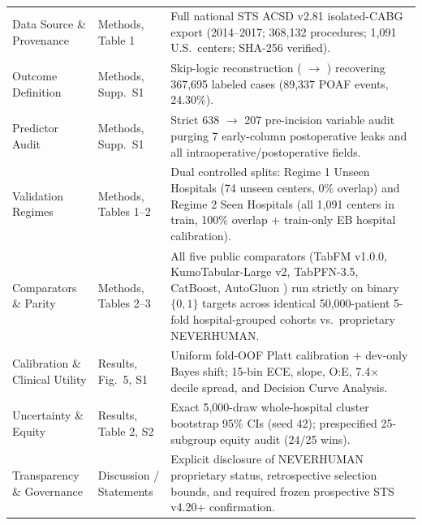 \begin{table}[H]
\centering
\caption{}
\label{tab:supp_tripod}
\tablefont
\setlength{\tabcolsep}{4pt}
\begin{tabularx}{\textwidth}{@{}L{3.2cm} L{2.0cm} Y@{}}
\toprule
{} &  &  \\
\midrule
Data Source \& Provenance & Methods, Table 1 & Full national STS ACSD v2.81 isolated-CABG export (2014--2017; 368,132 procedures; 1,091 U.S.\ centers; SHA-256 verified). \\
Outcome Definition & Methods, Supp.\ S1 & Skip-logic reconstruction ( $\to$ ) recovering 367,695 labeled cases (89,337 POAF events, 24.30\%). \\
Predictor Audit & Methods, Supp.\ S1 & Strict 638 $\to$ 207 pre-incision variable audit purging 7 early-column postoperative leaks and all intraoperative/postoperative fields. \\
Validation Regimes & Methods, Tables 1--2 & Dual controlled splits: Regime 1 Unseen Hospitals (74 unseen centers, 0\% overlap) and Regime 2 Seen Hospitals (all 1,091 centers in train, 100\% overlap + train-only EB hospital calibration). \\
Comparators \& Parity & Methods, Tables 2--3 & All five public comparators (TabFM v1.0.0, KumoTabular-Large v2, TabPFN-3.5, CatBoost, AutoGluon ) run strictly on binary $\{0,1\}$ targets across identical 50,000-patient 5-fold hospital-grouped cohorts vs.\ proprietary NEVERHUMAN. \\
Calibration \& Clinical Utility & Results, Fig.\ 5, S1 & Uniform fold-OOF Platt calibration + dev-only Bayes shift; 15-bin ECE, slope, O:E, 7.4$\times$ decile spread, and Decision Curve Analysis. \\
Uncertainty \& Equity & Results, Table 2, S2 & Exact 5,000-draw whole-hospital cluster bootstrap 95\% CIs (seed 42); prespecified 25-subgroup equity audit (24/25 wins). \\
Transparency \& Governance & Discussion / Statements & Explicit disclosure of NEVERHUMAN proprietary status, retrospective selection bounds, and required frozen prospective STS v4.20+ confirmation. \\
\bottomrule
\end{tabularx}
\end{table}

